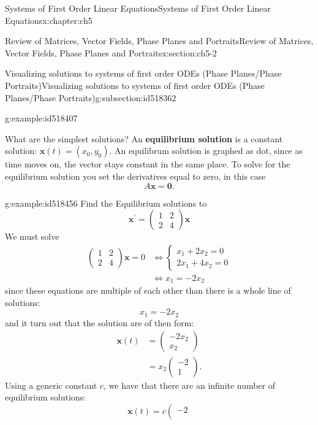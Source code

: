 \documentclass[oneside,10pt,]{book}
\newcommand{\terminology}[1]{\textbf{#1}}
\numberwithin{equation}{section}
\numberwithin{equation}{section}
\newcommand{\amp}{&}
\begin{document}
\begin{chapterptx}{Systems of First Order Linear Equations}{}{Systems of First Order Linear Equations}{}{}{x:chapter:ch5}
\begin{sectionptx}{Review of Matrices, Vector Fields, Phase Planes and Portraits}{}{Review of Matrices, Vector Fields, Phase Planes and Portraits}{}{}{x:section:ch5-2}
\begin{subsectionptx}{Visualizing solutions to systems of first order ODEs (Phase Planes\slash{}Phase Portraits)}{}{Visualizing solutions to systems of first order ODEs (Phase Planes\slash{}Phase Portraits)}{}{}{g:subsection:id518362}
\begin{example}{}{g:example:id518407}
%
\end{example}
What are the simplest solutions? An \terminology{equilibrium solution} is a constant solution: \(\mathbf{x}(t)=(x_{0},y_{0})\). An equilibrum solution is graphed as dot, since as time moves on, the vector stays constant in the same place. To solve for the equilibrium solution you set the derivatives equal to zero, in this case%
\begin{equation*}
A\mathbf{x}=\mathbf{0}.
\end{equation*}
%
\begin{example}{}{g:example:id518456}%
Find the Equilibrium solutions to%
\begin{equation*}
\mathbf{x}^{\prime}=\left(\begin{array}{cc}
1 \amp 2\\
2 \amp 4
\end{array}\right)\mathbf{x}
\end{equation*}
We must solve%
\begin{align*}
\left(\begin{array}{cc}
1 \amp 2\\
2 \amp 4
\end{array}\right)\mathbf{x}=0 \amp \iff\begin{cases}
x_{1}+2x_{2}=0\\
2x_{1}+4x_{2}=0
\end{cases}\\
\amp \iff x_{1}=-2x_{2}
\end{align*}
since these equations are multiple of each other than there is a whole line of solutions:%
\begin{equation*}
x_{1}=-2x_{2}
\end{equation*}
and it turn out that the solution are of then form:%
\begin{align*}
\mathbf{x}(t) \amp =\left(\begin{array}{c}
-2x_{2}\\
x_{2}
\end{array}\right)\\
\amp =x_{2}\left(\begin{array}{c}
-2\\
1
\end{array}\right).
\end{align*}
Using a generic constant \(c \), we have that there are an infinite number of equilibrium solutions:%
\begin{equation*}
\mathbf{x}(t)=c\left(\begin{array}{c}
-2\\

\end{array}
\end{equation*}
\end{example}
\end{subsectionptx}
\end{sectionptx}
\end{chapterptx}
\end{document}
